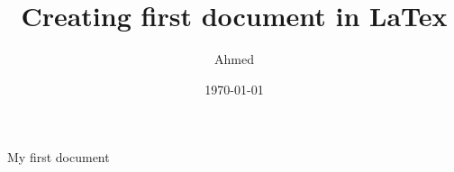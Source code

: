 \documentclass{article}
\title{Creating first document in LaTex}
\author{Ahmed}
\date{\today}
\begin{document}
\maketitle
My first document
\end{document}
